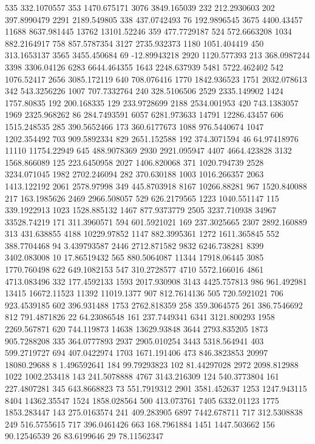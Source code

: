535	332.1070557
353	1470.675171
3076	3849.165039
232	212.2930603
202	397.8990479
2291	2189.549805
338	437.0742493
76	192.9896545
3675	4400.43457
11688	8637.981445
13762	13101.52246
359	477.7729187
524	572.6663208
1034	882.2164917
758	857.5787354
3127	2735.932373
1180	1051.404419
450	313.1653137
3565	3455.450684
69	-12.89943218
2920	1120.577393
213	368.0987244
3398	3306.04126
6283	6644.464355
1643	2248.637939
5481	5722.462402
542	1076.52417
2656	3085.172119
640	708.076416
1770	1842.936523
1751	2032.078613
342	543.3256226
1007	707.7332764
240	328.5106506
2529	2335.149902
1424	1757.80835
192	200.168335
129	233.9728699
2188	2534.001953
420	743.1383057
1969	2325.968262
86	284.7493591
6057	6281.973633
14791	12286.43457
606	1515.248535
285	390.5652466
173	360.6177673
1088	976.5440674
1047	1202.354492
703	909.5892334
829	2651.152588
192	374.3071594
46	64.97418976
11110	11754.22949
645	488.9078369
2930	2921.095947
4407	4664.423828
3132	1568.866089
125	223.6450958
2027	1406.820068
371	1020.794739
2528	3234.071045
1982	2702.246094
282	370.630188
1003	1016.266357
2063	1413.122192
2061	2578.97998
349	445.8703918
8167	10266.88281
967	1520.840088
217	163.1985626
2469	2966.508057
529	626.2179565
1223	1040.551147
115	339.1922913
1023	1528.885132
1467	877.9373779
2505	3237.710938
34967	33528.74219
171	311.3960571
594	601.5921021
169	237.3025665
2307	2892.160889
313	431.638855
4188	10229.97852
1147	882.3995361
1272	1611.365845
552	388.7704468
94	3.439793587
2446	2712.871582
9832	6246.738281
8399	3402.083008
10	17.86519432
565	880.5064087
11344	17918.06445
3085	1770.760498
622	649.1082153
547	310.2728577
4710	5572.166016
4861	4713.083496
332	177.4592133
1593	2017.930908
3143	4425.757813
986	961.492981
13415	16672.11523
11392	11019.1377
907	812.7614136
505	720.5921021
706	923.4539185
602	396.931488
1753	2762.818359
258	359.3064575
261	386.7546692
812	791.4871826
22	64.23086548
161	237.7449341
6341	3121.800293
1958	2269.567871
620	744.119873
14638	13629.93848
3644	2793.835205
1873	905.7288208
335	364.0777893
2937	2905.010254
3443	5318.564941
403	599.2719727
694	407.0422974
1703	1671.191406
473	846.3823853
20997	18080.29688
8	1.496592641
184	99.79293823
102	81.44297028
2972	2098.812988
1022	1002.253418
143	241.5078888
4767	3143.216309
124	540.3773804
161	227.4807281
345	643.8668823
73	551.7919312
2901	3581.452637
1253	1247.943115
8404	14362.35547
1524	1858.028564
500	413.073761
7405	6332.01123
1775	1853.283447
143	275.0163574
241	409.283905
6897	7442.678711
717	312.5308838
249	516.5755615
717	396.0461426
663	168.7961884
1451	1447.503662
156	90.12546539
26	83.6199646
29	78.11562347
